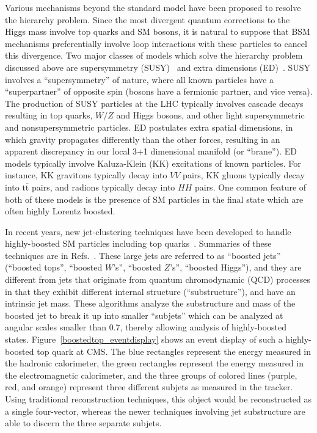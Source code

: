 \documentclass[12pt]{proposalnsf}
\newcommand{\ttbar}        {\ensuremath{\mathrm{t}\overline{\mathrm{t}}}}
\begin{document}
Various mechanisms beyond the standard model
have been proposed to resolve the hierarchy problem.
Since the most divergent 
quantum corrections to the Higgs mass
involve top quarks and SM bosons, it is natural to suppose
that BSM mechanisms preferentially involve loop interactions with these
particles to cancel this divergence.
Two major classes of models which solve the hierarchy problem
discussed above are supersymmetry
(SUSY)~\cite{Gunion:1987qv,Feng:1999mn,Kitano:2006gv,Barbieri:2009ev,Horton:2009ed}
and extra dimensions (ED)~\cite{ed,rs1,rs2,rs_gluon_1}. SUSY involves
a ``supersymmetry'' of nature, where all known particles have a
``superpartner'' of opposite spin (bosons have a fermionic partner,
and vice versa). The production of SUSY particles at the LHC typically
involves cascade decays resulting in top quarks, $W/Z$ and Higgs
bosons, and other light supersymmetric and nonsupersymmetric
particles. ED postulates extra
spatial dimensions, in which gravity propagates differently than the
other forces, resulting in an apparent discrepancy in our local 3+1 dimensional
manifold (or ``brane''). ED models typically involve
Kaluza-Klein (KK) excitations of known particles. For instance, KK
gravitons typically decay into $VV$ pairs, KK gluons typically decay
into $\ttbar$ pairs, and radions typically decay into $HH$ pairs. 
One common feature of both of these models is the presence of SM
particles in the final state which are often highly Lorentz boosted. 



In recent years, new jet-clustering techniques have been developed to handle
highly-boosted SM particles including top
quarks~\cite{Seymour:1993mx,boostedhiggs,catop_theory,catop_cms,jetpruning1,jetpruning2,nsub,heptoptagger,trimming}.
Summaries of these techniques are in Refs.~\cite{boost2010,boost2011}.
These
large jets are referred to as 
``boosted jets'' (``boosted tops'', ``boosted $W$'s'', ``boosted
$Z$'s'', ``boosted Higgs''), and they are
different from jets that originate from quantum chromodynamic (QCD)
processes in that they exhibit different internal structure
(``substructure''), and have an intrinsic jet mass. 
These algorithms
analyze the substructure and mass
of the boosted jet to break it up into smaller ``subjets'' which can be
analyzed at angular scales smaller than 0.7, thereby allowing analysis
of highly-boosted states. Figure~\ref{boostedtop_eventdisplay}
shows an event display of such a highly-boosted top quark at CMS. 
The blue rectangles represent the
energy measured in the hadronic calorimeter, the green
rectangles represent the energy measured in the electromagnetic
calorimeter, and the three groups of colored lines (purple, red,
and orange) represent three different subjets as measured in
the tracker. Using traditional reconstruction techniques, this object
would be reconstructed as a single four-vector, whereas the newer
techniques involving jet substructure are able to discern the three
separate subjets. 
\end{document}
